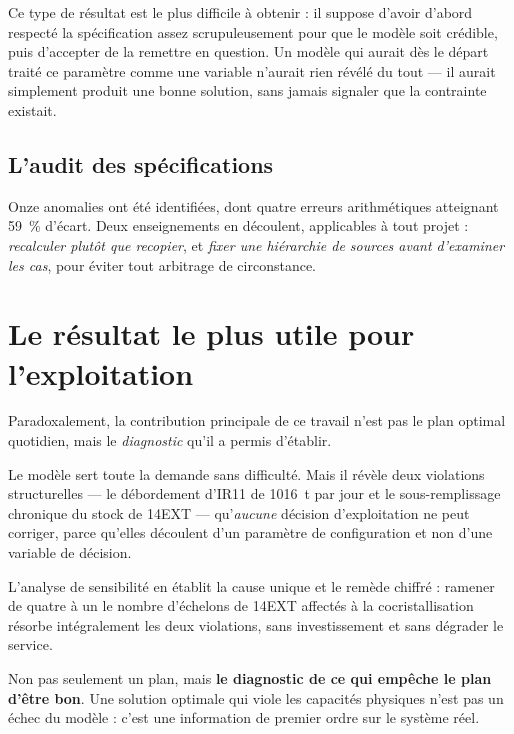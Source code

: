 Ce type de résultat est le plus difficile à obtenir : il suppose d'avoir d'abord respecté la
spécification assez scrupuleusement pour que le modèle soit crédible, puis d'accepter de la
remettre en question. Un modèle qui aurait dès le départ traité ce paramètre comme une
variable n'aurait rien révélé du tout --- il aurait simplement produit une bonne solution,
sans jamais signaler que la contrainte existait.

\subsection{L'audit des spécifications}

Onze anomalies ont été identifiées, dont quatre erreurs arithmétiques atteignant
\SI{59}{\percent} d'écart. Deux enseignements en découlent, applicables à tout projet :
\emph{recalculer plutôt que recopier}, et \emph{fixer une hiérarchie de sources avant
d'examiner les cas}, pour éviter tout arbitrage de circonstance.

\section{Le résultat le plus utile pour l'exploitation}

Paradoxalement, la contribution principale de ce travail n'est pas le plan optimal
quotidien, mais le \emph{diagnostic} qu'il a permis d'établir.

Le modèle sert toute la demande sans difficulté. Mais il révèle deux violations
structurelles --- le débordement d'IR11 de \SI{1016}{\tonne} par jour et le sous-remplissage
chronique du stock de 14EXT --- qu'\emph{aucune} décision d'exploitation ne peut corriger,
parce qu'elles découlent d'un paramètre de configuration et non d'une variable de décision.

L'analyse de sensibilité en établit la cause unique et le remède chiffré : ramener de quatre
à un le nombre d'échelons de 14EXT affectés à la cocristallisation résorbe intégralement les
deux violations, sans investissement et sans dégrader le service.

\begin{encadre}[title={Ce qu'un modèle d'optimisation doit produire}]
Non pas seulement un plan, mais \textbf{le diagnostic de ce qui empêche le plan d'être bon}.
Une solution optimale qui viole les capacités physiques n'est pas un échec du modèle : c'est
une information de premier ordre sur le système réel.
\end{encadre}

